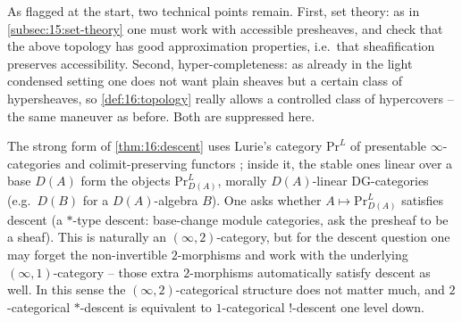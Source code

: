 \begin{remark}
\label{rmk:16:caveats}
As flagged at the start, two technical points remain. First, set theory: as in
\cref{subsec:15:set-theory} one must work with accessible presheaves, and check that the
above topology has good approximation properties, i.e.\ that sheafification preserves
accessibility. Second, hyper-completeness: as already in the light condensed setting one
does not want plain sheaves but a certain class of hypersheaves, so
\cref{def:16:topology} really allows a controlled class of hypercovers -- the same
maneuver as before. Both are suppressed here.
\end{remark}

\begin{remark}
\label{rmk:16:2cat-descent}
The strong form of \cref{thm:16:descent} uses Lurie's category $\mathrm{Pr}^L$ of
presentable $\infty$-categories and colimit-preserving functors \cite{lurie2017higher};
inside it, the stable ones linear over a base $D(A)$ form the objects
$\mathrm{Pr}^L_{D(A)}$, morally $D(A)$-linear DG-categories (e.g.\ $D(B)$ for a
$D(A)$-algebra $B$). One asks whether $A\mapsto\mathrm{Pr}^L_{D(A)}$ satisfies descent
(a $*$-type descent: base-change module categories, ask the presheaf to be a sheaf).
This is naturally an $(\infty,2)$-category, but for the descent question one may forget
the non-invertible $2$-morphisms and work with the underlying $(\infty,1)$-category --
those extra $2$-morphisms automatically satisfy descent as well. In this sense the
$(\infty,2)$-categorical structure does not matter much, and $2$-categorical
$*$-descent is equivalent to $1$-categorical $!$-descent one level down.
\end{remark}
